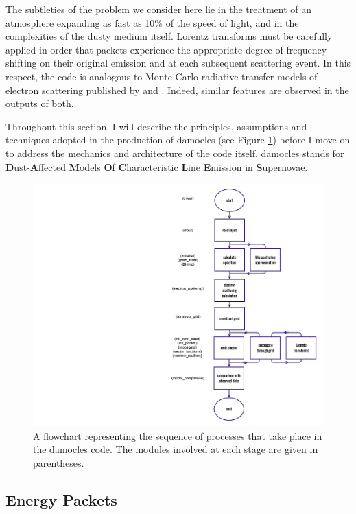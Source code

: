 The subtleties of the problem we consider here lie in the treatment of an atmosphere expanding as fast as 10\% of the speed of light, and in the complexities of the dusty medium itself.  Lorentz transforms must be carefully applied in order that packets experience the appropriate degree of frequency shifting on their original  emission and at each subsequent scattering event.  In this respect, the code is analogous to Monte Carlo radiative transfer models of electron scattering published by \citet{Auer1972} and \citet{Hillier1991}.  Indeed, similar features are observed in the outputs of both.

Throughout this section, I will describe the principles, assumptions and techniques adopted in the production of {\sc damocles} (see Figure \ref{fig:flowchart}) before I move on to address the mechanics and architecture of the code itself.  {\sc damocles} stands for \textbf{D}ust-\textbf{A}ffected \textbf{M}odels \textbf{O}f \textbf{C}haracteristic \textbf{L}ine \textbf{E}mission in \textbf{S}upernovae.


\begin{figure}
\centering
\includegraphics[scale=0.185, trim=650mm 25mm 8mm 25mm]{chapters/chapter2/code_flow.png}
\caption{A flowchart representing the sequence of processes that take place in the {\sc damocles} code.  The modules involved at each stage are given in parentheses.}
\label{fig:flowchart}
\end{figure}



\subsection{Energy Packets}

